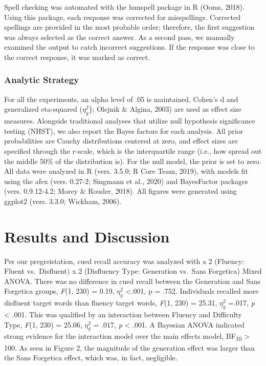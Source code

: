 \documentclass[
  english,
  jou]{apa6}
\begin{document}
Spell checking was automated with the hunspell package in R (Ooms, 2018). Using this package, each response was corrected for misspellings. Corrected spellings are provided in the most probable order; therefore, the first suggestion was always selected as the correct answer. As a second pass, we manually examined the output to catch incorrect suggestions. If the response was close to the correct response, it was marked as correct.

\hypertarget{analytic-strategy}{%
\subsubsection{Analytic Strategy}\label{analytic-strategy}}

For all the experiments, an alpha level of .05 is maintained. Cohen's d and generalized eta-squared (\(\eta_{g}^{2}\)\}; Olejnik \& Algina, 2003) are used as effect size measures. Alongside traditional analyses that utilize null hypothesis significance testing (NHST), we also report the Bayes factors for each analysis. All prior probabilities are Cauchy distributions centered at zero, and effect sizes are specified through the r-scale, which is the interquartile range (i.e., how spread out the middle 50\% of the distribution is). For the null model, the prior is set to zero. All data were analyzed in R (vers. 3.5.0; R Core Team, 2019), with models fit using the afex (vers. 0.27-2; Singmann et al., 2020) and BayesFactor packages (vers. 0.9.12-4.2; Morey \& Rouder, 2018). All figures were generated using ggplot2 (vers. 3.3.0; Wickham, 2006).

\hypertarget{results-and-discussion}{%
\section{Results and Discussion}\label{results-and-discussion}}

Per our pregreistation, cued recall accuracy was analyzed with a 2 (Fluency: Fluent vs.~Disfluent) x 2 (Disfluency Type: Generation vs.~Sans Forgetica) Mixed ANOVA. There was no difference in cued recall between the Generation and Sans Forgetica groups, \emph{F}(1, 230) = 0.19, \(\eta_{g}^{2}\) \textless.001, p = .752. Individuals recalled more disfluent target words than fluency target words, \emph{F}(1, 230) = 25.31, \(\eta_{g}^{2}\) =.017, \emph{p} \textless{} .001. This was qualified by an interaction between Fluency and Difficulty Type, \emph{F}(1, 230) = 25.06, \(\eta_{g}^{2}\) = .017, \emph{p} \textless{} .001. A Bayesian ANOVA indicated strong evidence for the interaction model over the main effects model, BF\textsubscript{10} \textgreater{} 100. As seen in Figure 2, the magnitude of the generation effect was larger than the Sans Forgetica effect, which was, in fact, negligible.
\end{document}
